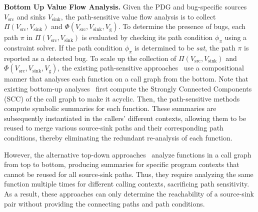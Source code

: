 \textbf{Bottom Up Value Flow Analysis.}
Given the PDG and bug-specific sources $V_{\text{src}}$ and sinks $V_{\text{sink}}$, the path-sensitive value flow analysis is to collect $\Pi(V_{\text{src}}, V_{\text{sink}})$ and $\Phi(V_{\text{src}}, V_{\text{sink}}, V_{\text{g}})$.
To determine the presence of bugs, each path $\pi$ in $\Pi(V_{\text{src}}, V_{\text{sink}})$ is evaluated by checking its path condition $\phi_{\pi}$ using a constraint solver.
If the path condition $\phi_{\pi}$ is determined to be \textit{sat}, the path $\pi$ is reported as a detected bug.
To scale up the collection of $\Pi(V_{\text{src}}, V_{\text{sink}})$ and $\Phi(V_{\text{src}}, V_{\text{sink}}, V_{\text{g}})$, the existing path-sensitive approaches~\cite{cousot2002modular, xie2005scalable, shi2018pinpoint, shi2020conquering, shi2020pipelining, shi2021path} use a compositional manner that analyses each function on a call graph from the bottom.
Note that existing bottom-up analyses~\cite{cousot2002modular, xie2005scalable, shi2018pinpoint, shi2020conquering, shi2020pipelining} first compute the Strongly Connected Components (SCC) of the call graph to make it acyclic.
Then, the path-sensitive methods compute symbolic summaries for each function. 
These summaries are subsequently instantiated in the callers' different contexts, allowing them to be reused to merge various source-sink paths and their corresponding path conditions, thereby eliminating the redundant re-analysis of each function.

However, the alternative top-down approaches~\cite{reps1995precise, reps1994speeding, murphy1999program, sagiv1996precise} analyze functions in a call graph from top to bottom, producing summaries for specific program contexts that cannot be reused for all source-sink paths. Thus, they require analyzing the same function multiple times for different calling contexts, sacrificing path sensitivity. 
As a result, these approaches can only determine the reachability of a source-sink pair without providing the connecting paths and path conditions.


